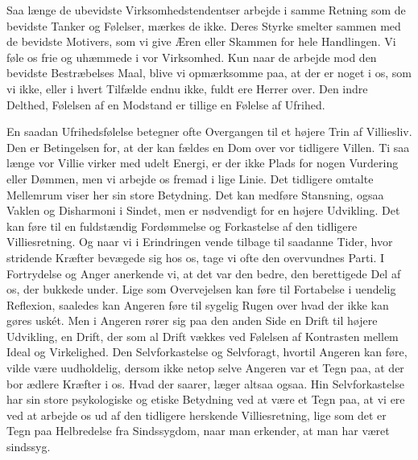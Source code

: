 \documentclass[12pt,a4paper,openany]{book}
\begin{document}
Saa længe de ubevidste Virksomhedstendentser arbejde i samme Retning som
de bevidste Tanker og Følelser, mærkes de ikke. Deres Styrke smelter
sammen med de bevidste Motivers, som vi give Æren eller Skammen for hele
Handlingen. Vi føle os frie og uhæmmede i vor Virksomhed. Kun naar de
arbejde mod den bevidste Bestræbelses Maal, blive vi opmærksomme paa, at
der er noget i os, som vi ikke, eller i hvert Tilfælde endnu ikke, fuldt
ere Herrer over. Den indre Delthed, Følelsen af en Modstand er tillige
en Følelse af Ufrihed.

En saadan Ufrihedsfølelse betegner ofte Overgangen til et højere Trin af
Villiesliv. Den er Betingelsen for, at der kan fældes en Dom over vor
tidligere Villen. Ti saa længe vor Villie virker med udelt Energi, er
der ikke Plads for nogen Vurdering eller Dømmen, men vi arbejde os
fremad i lige Linie. Det tidligere omtalte Mellemrum viser her sin store
Betydning. Det kan medføre Stansning, ogsaa Vaklen og Disharmoni i
Sindet, men er nødvendigt for en højere Udvikling. Det kan føre til en
fuldstændig Fordømmelse og Forkastelse af den tidligere Villiesretning.
Og naar vi i Erindringen vende tilbage til saadanne Tider, hvor
stridende Kræfter bevægede sig hos os, tage vi ofte den overvundnes
Parti. I Fortrydelse og Anger anerkende vi, at det var den bedre, den
berettigede Del af os, der bukkede under. Lige som Overvejelsen kan føre
til Fortabelse i uendelig Reflexion, saaledes kan Angeren føre til
sygelig Rugen over hvad der ikke kan gøres uskét. Men i Angeren rører
sig paa den anden Side en Drift til højere Udvikling, en Drift, der som
al Drift vækkes ved Følelsen af Kontrasten mellem Ideal og Virkelighed.
Den Selvforkastelse og Selvforagt, hvortil Angeren kan føre, vilde være
uudholdelig, dersom ikke netop selve Angeren var et Tegn paa, at der bor
ædlere Kræfter i os. Hvad der saarer, læger altsaa ogsaa. Hin
Selvforkastelse har sin store psykologiske og etiske Betydning ved at
være et Tegn paa, at vi ere ved at arbejde os ud af den tidligere
herskende Villiesretning, lige som det er Tegn paa Helbredelse fra
Sindssygdom, naar man erkender, at man har været sindssyg.
\end{document}
